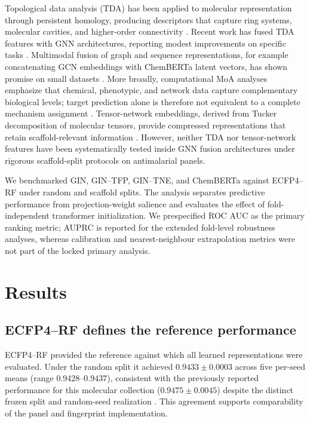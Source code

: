 \documentclass[11pt,a4paper]{article}
\begin{document}
Topological data analysis (TDA) has been applied to molecular representation through persistent homology, producing descriptors that capture ring systems, molecular cavities, and higher-order connectivity \citep{tda_review_2025}. Recent work has fused TDA features with GNN architectures, reporting modest improvements on specific tasks \citep{topology_molecular_representations_2025}. Multimodal fusion of graph and sequence representations, for example concatenating GCN embeddings with ChemBERTa latent vectors, has shown promise on small datasets \citep{rollins2024molprop}. More broadly, computational MoA analyses emphasize that chemical, phenotypic, and network data capture complementary biological levels; target prediction alone is therefore not equivalent to a complete mechanism assignment \citep{Trapotsi2022MoA}. Tensor-network embeddings, derived from Tucker decomposition of molecular tensors, provide compressed representations that retain scaffold-relevant information \citep{tn_efficient_2026}. However, neither TDA nor tensor-network features have been systematically tested inside GNN fusion architectures under rigorous scaffold-split protocols on antimalarial panels.

We benchmarked GIN, GIN--TFP, GIN--TNE, and ChemBERTa against ECFP4--RF under random and scaffold splits. The analysis separates predictive performance from projection-weight salience and evaluates the effect of fold-independent transformer initialization. We prespecified ROC AUC as the primary ranking metric; AUPRC is reported for the extended fold-level robustness analyses, whereas calibration and nearest-neighbour extrapolation metrics were not part of the locked primary analysis.

\section{Results}

\subsection{ECFP4--RF defines the reference performance}

ECFP4--RF provided the reference against which all learned representations were evaluated. Under the random split it achieved $\num{0.9433} \pm \num{0.0003}$ across five per-seed means (range \num{0.9428}--\num{0.9437}), consistent with the previously reported performance for this molecular collection ($\num{0.9475} \pm \num{0.0045}$) despite the distinct frozen split and random-seed realization \citep{temgoua2027quantum}. This agreement supports comparability of the panel and fingerprint implementation.
\end{document}
